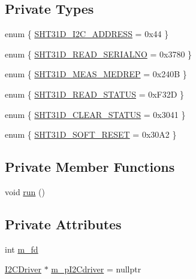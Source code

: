 \subsection*{Private Types}
\begin{DoxyCompactItemize}
\item 
enum \{ \hyperlink{classSHT31D_a5810e24af0e5737b6df24089366100fea7a00c3f8439a0de223d6fe77132acc69}{S\+H\+T31\+D\+\_\+\+I2\+C\+\_\+\+A\+D\+D\+R\+E\+SS} = 0x44
 \}
\item 
enum \{ \hyperlink{classSHT31D_abcfdc15982f0b22747afa7e3c325706aa4cdf0feb8a281e9ea9b49c913666f765}{S\+H\+T31\+D\+\_\+\+R\+E\+A\+D\+\_\+\+S\+E\+R\+I\+A\+L\+NO} = 0x3780
 \}
\item 
enum \{ \hyperlink{classSHT31D_aff87615787f9fd6f287b22b5f407d222a8a5caa21d4686c35ce1b7ff092c8f01d}{S\+H\+T31\+D\+\_\+\+M\+E\+A\+S\+\_\+\+M\+E\+D\+R\+EP} = 0x240B
 \}
\item 
enum \{ \hyperlink{classSHT31D_a72375ee81208748cd053d13a256c25cda0c1298490bd20d683dd0a189d1f33f80}{S\+H\+T31\+D\+\_\+\+R\+E\+A\+D\+\_\+\+S\+T\+A\+T\+US} = 0x\+F32D
 \}
\item 
enum \{ \hyperlink{classSHT31D_a40c567ed542f06f8cc22db0764415419ab93931def2227da6c7bcb0ec8d2ac171}{S\+H\+T31\+D\+\_\+\+C\+L\+E\+A\+R\+\_\+\+S\+T\+A\+T\+US} = 0x3041
 \}
\item 
enum \{ \hyperlink{classSHT31D_ae72fd59d3f80785321012a7d001a9008a8143b8b9241db83920c6fe106b9b787a}{S\+H\+T31\+D\+\_\+\+S\+O\+F\+T\+\_\+\+R\+E\+S\+ET} = 0x30\+A2
 \}
\end{DoxyCompactItemize}
\subsection*{Private Member Functions}
\begin{DoxyCompactItemize}
\item 
void \hyperlink{classSHT31D_a1cb98e435a44e2b6beeb3d0226cc9ec8}{run} ()
\end{DoxyCompactItemize}
\subsection*{Private Attributes}
\begin{DoxyCompactItemize}
\item 
int \hyperlink{classSHT31D_a2740f957337c1944421401643a6a15b6}{m\+\_\+fd}
\item 
\hyperlink{classI2CDriver}{I2\+C\+Driver} $\ast$ \hyperlink{classSHT31D_ad76767dc72097d43aea68675ae33e1ed}{m\+\_\+p\+I2\+Cdriver} = nullptr
\end{DoxyCompactItemize}


